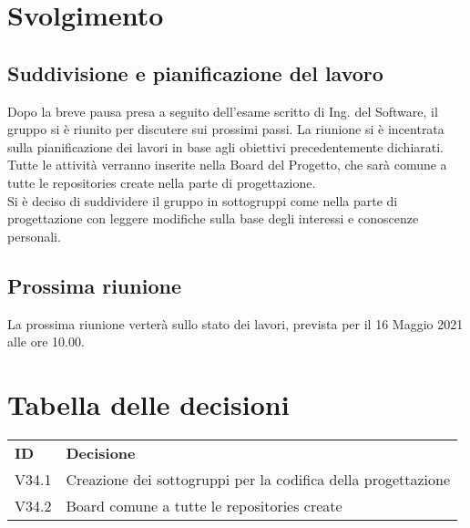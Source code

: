 \documentclass[]{article}
\begin{document}
	\newpage

	\section{Svolgimento}
	
	\subsection{Suddivisione e pianificazione del lavoro}
	Dopo la breve pausa presa a seguito dell'esame scritto di Ing. del Software, il gruppo si è riunito per discutere sui prossimi passi. La riunione si è incentrata sulla pianificazione dei lavori in base agli obiettivi precedentemente dichiarati.\\
	Tutte le attività verranno inserite nella Board del Progetto, che sarà comune a tutte le repositories create nella parte di progettazione.\\
	Si è deciso di suddividere il gruppo in sottogruppi come nella parte di progettazione con leggere modifiche sulla base degli interessi e conoscenze personali.
	
	
	\subsection{Prossima riunione}
La prossima riunione verterà sullo stato dei lavori, prevista per il 16 Maggio 2021 alle ore 10.00.

	\section{Tabella delle decisioni}

	\begin{table} [h!]
		\begin{center}
			\begin{tabular} { m{2cm} m{14cm} }
				\rowcolor{lightgray}
				\textbf{ID} & \textbf{Decisione}\\
				V34.1 & Creazione dei sottogruppi per la codifica della progettazione \\
				V34.2 & Board comune a tutte le repositories create\\
			\end{tabular}
		\end{center}
	\end{table}
\end{document}
